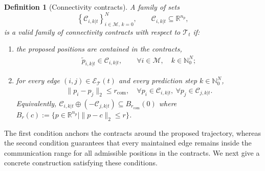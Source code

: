 \documentclass[letterpaper, 10 pt, conference]{ieeeconf}  %
\newtheorem{definition}{Definition}
\newcommand{\Ball}[2]{B_{#1}\!\left(#2\right)}
\begin{document}
\begin{definition}[Connectivity contracts]
	\label{def:connectivity_contracts}
	A family of sets
	\[
		\left\{\mathcal{C}_{i,k|t}\right\}_{i\in\mathcal{M},\,k=0}^{N},
		\qquad
		\mathcal{C}_{i,k|t}\subseteq\mathbb{R}^{n_p},
	\]
	is a valid family of connectivity contracts with respect to $\mathcal{T}_t$ if:

	\begin{enumerate}
		\item the proposed positions are contained in the contracts,
		      \begin{align}
			      \tilde p_{i,k|t}\in\mathcal{C}_{i,k|t},
			      \qquad
			      \forall i\in\mathcal{M},\quad k\in\mathbb{N}_0^N;
			      \label{eq:proposed_positions_inside_connectivity_contracts}
		      \end{align}

		\item for every edge $(i,j)\in\mathcal{E}_{\mathcal{T}}(t)$ and every
		      prediction step $k\in\mathbb{N}_0^N$,
		      \begin{align}
			      \|p_i-p_j\|_2 \leq r_{\mathrm{com}},
			      \quad
			      \forall p_i\in\mathcal{C}_{i,k|t},\
			      \forall p_j\in\mathcal{C}_{j,k|t}.
			      \label{eq:pairwise_connectivity_contract_condition}
		      \end{align}
		      Equivalently,
		      $\mathcal{C}_{i,k|t}\oplus(-\mathcal{C}_{j,k|t})
			      \subseteq \Ball{r_{\mathrm{com}}}{0}$ where $\Ball{r}{c}:=\{p\in\mathbb{R}^{n_p}\mid \|p-c\|_2\le r\}$.
	\end{enumerate}
\end{definition}


The first condition anchors the contracts around the proposed trajectory,
whereas the second condition guarantees that every maintained edge remains
inside the communication range for all admissible positions in the contracts.
We next give a concrete construction satisfying these conditions.
\end{document}
